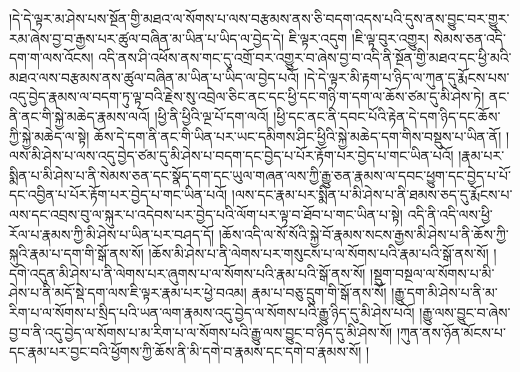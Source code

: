 །དེ་དེ་ལྟར་མ་ཤེས་པས་སྔོན་གྱི་མཐའ་ལ་སོགས་པ་ལས་བརྩམས་ནས་ཅི་བདག་འདས་པའི་དུས་ནས་བྱུང་བར་གྱུར་རམ་ཞེས་བྱ་བ་རྒྱས་པར་ཚུལ་བཞིན་མ་ཡིན་པ་ཡིད་ལ་བྱེད་དེ། ཇི་ལྟར་འདུག །ཇི་ལྟ་བུར་འགྱུར། སེམས་ཅན་འདི་དག་ག་ལས་འོངས། འདི་ནས་ཤི་འཕོས་ནས་གང་དུ་འགྲོ་བར་འགྱུར་བ་ཞེས་བྱ་བ་འདི་ནི་སྔོན་གྱི་མཐའ་དང་ཕྱི་མའི་མཐའ་ལས་བརྩམས་ནས་ཚུལ་བཞིན་མ་ཡིན་པ་ཡིད་ལ་བྱེད་པའོ། །དེ་དེ་ལྟར་མི་རྟག་པ་ཉིད་ལ་ཀུན་དུ་རྨོངས་པས་འདུ་བྱེད་རྣམས་ལ་བདག་ཏུ་ལྟ་བའི་རྗེས་སུ་འབྲེལ་ཅིང་ནང་དང་ཕྱི་དང་གཉི་ག་དག་ལ་ཆོས་ཙམ་དུ་མི་ཤེས་ཏེ། ནང་ནི་ནང་གི་སྐྱེ་མཆེད་རྣམས་ལའོ། །ཕྱི་ནི་ཕྱིའི་ལྔ་པོ་དག་ལའོ། །ཕྱི་དང་ནང་ནི་དབང་པོའི་རྟེན་དེ་དག་ཉིད་དང་ཆོས་ཀྱི་སྐྱེ་མཆེད་ལ་སྟེ། ཆོས་དེ་དག་ནི་ནང་གི་ཡིན་པར་ཡང་དམིགས་ཤིང་ཕྱིའི་སྐྱེ་མཆེད་དག་གིས་བསྡུས་པ་ཡིན་ནོ། །ལས་མི་ཤེས་པ་ལས་འདུ་བྱེད་ཙམ་དུ་མི་ཤེས་པ་བདག་དང་བྱེད་པ་པོར་རྟོག་པར་བྱེད་པ་གང་ཡིན་པའོ། །རྣམ་པར་སྨིན་པ་མི་ཤེས་པ་ནི་སེམས་ཅན་དང་སྣོད་དག་དང་ཡུལ་གཞན་ལས་ཀྱི་རྒྱུ་ཅན་རྣམས་ལ་དབང་ཕྱུག་དང་བྱེད་པ་པོ་དང་འབྱིན་པ་པོར་རྟོག་པར་བྱེད་པ་གང་ཡིན་པའོ། །ལས་དང་རྣམ་པར་སྨིན་པ་མི་ཤེས་པ་ནི་ཐམས་ཅད་དུ་རྨོངས་པ་ལས་དང་འབྲས་བུ་ལ་སྐུར་པ་འདེབས་པར་བྱེད་པའི་ལོག་པར་ལྟ་བ་ཐོབ་པ་གང་ཡིན་པ་སྟེ། འདི་ནི་འདི་ལས་ཕྱི་རོལ་པ་རྣམས་ཀྱི་མི་ཤེས་པ་ཡིན་པར་བཤད་དོ། །ཆོས་འདི་ལ་སོ་སོའི་སྐྱེ་བོ་རྣམས་སངས་རྒྱས་མི་ཤེས་པ་ནི་ཆོས་ཀྱི་སྐུའི་རྣམ་པ་དག་གི་སྒོ་ནས་སོ། །ཆོས་མི་ཤེས་པ་ནི་ལེགས་པར་གསུངས་པ་ལ་སོགས་པའི་རྣམ་པའི་སྒོ་ནས་སོ། །དགེ་འདུན་མི་ཤེས་པ་ནི་ལེགས་པར་ཞུགས་པ་ལ་སོགས་པའི་རྣམ་པའི་སྒོ་ནས་སོ། །སྡུག་བསྔལ་ལ་སོགས་པ་མི་ཤེས་པ་ནི་མདོ་སྡེ་དག་ལས་ཇི་ལྟར་རྣམ་པར་ཕྱེ་བའམ། རྣམ་པ་བཅུ་དྲུག་གི་སྒོ་ནས་སོ། །རྒྱུ་དག་མི་ཤེས་པ་ནི་མ་རིག་པ་ལ་སོགས་པ་སྲིད་པའི་ཡན་ལག་རྣམས་འདུ་བྱེད་ལ་སོགས་པའི་རྒྱུ་ཉིད་དུ་མི་ཤེས་པའོ། །རྒྱུ་ལས་བྱུང་བ་ཞེས་བྱ་བ་ནི་འདུ་བྱེད་ལ་སོགས་པ་མ་རིག་པ་ལ་སོགས་པའི་རྒྱུ་ལས་བྱུང་བ་ཉིད་དུ་མི་ཤེས་སོ། །ཀུན་ནས་ཉོན་མོངས་པ་དང་རྣམ་པར་བྱང་བའི་ཕྱོགས་ཀྱི་ཆོས་ནི་མི་དགེ་བ་རྣམས་དང་དགེ་བ་རྣམས་སོ། །
